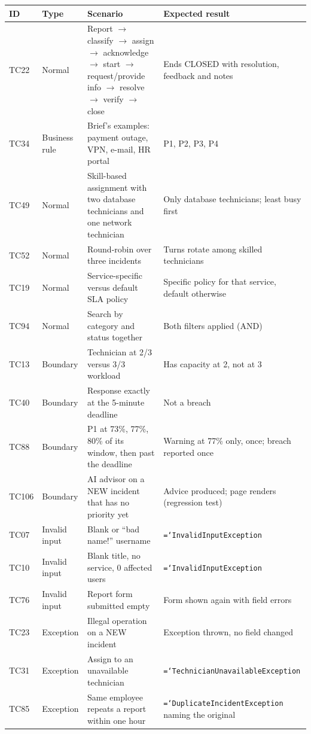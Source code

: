 \documentclass[11pt,a4paper]{article}
\newcommand{\code}[1]{\texttt{\hyphenchar\font=`\-\relax #1}}
\begin{document}
\begin{longtable}{@{}L{1.1cm}L{2.2cm}L{5.8cm}L{6cm}@{}}
\toprule
\textbf{ID} & \textbf{Type} & \textbf{Scenario} & \textbf{Expected result} \\
\midrule\endhead
TC22 & Normal & Report $\rightarrow$ classify $\rightarrow$ assign $\rightarrow$ acknowledge $\rightarrow$ start $\rightarrow$ request/provide info $\rightarrow$ resolve $\rightarrow$ verify $\rightarrow$ close & Ends CLOSED with resolution, feedback and notes \\
TC34 & Business rule & Brief's examples: payment outage, VPN, e-mail, HR portal & P1, P2, P3, P4 \\
TC49 & Normal & Skill-based assignment with two database technicians and one network technician & Only database technicians; least busy first \\
TC52 & Normal & Round-robin over three incidents & Turns rotate among skilled technicians \\
TC19 & Normal & Service-specific versus default SLA policy & Specific policy for that service, default otherwise \\
TC94 & Normal & Search by category and status together & Both filters applied (AND) \\
TC13 & Boundary & Technician at 2/3 versus 3/3 workload & Has capacity at 2, not at 3 \\
TC40 & Boundary & Response exactly at the 5-minute deadline & Not a breach \\
TC88 & Boundary & P1 at 73\%, 77\%, 80\% of its window, then past the deadline & Warning at 77\% only, once; breach reported once \\
TC106 & Boundary & AI advisor on a NEW incident that has no priority yet & Advice produced; page renders (regression test) \\
TC07 & Invalid input & Blank or ``bad name!'' username & \code{InvalidInputException} \\
TC10 & Invalid input & Blank title, no service, 0 affected users & \code{InvalidInputException} \\
TC76 & Invalid input & Report form submitted empty & Form shown again with field errors \\
TC23 & Exception & Illegal operation on a NEW incident & Exception thrown, no field changed \\
TC31 & Exception & Assign to an unavailable technician & \code{TechnicianUnavailableException} \\
TC85 & Exception & Same employee repeats a report within one hour & \code{DuplicateIncidentException} naming the original \\

\end{longtable}
\end{document}
